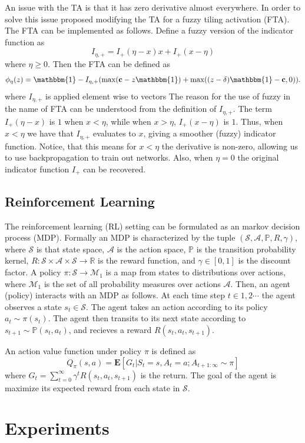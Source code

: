 \documentclass{article}
\newcommand{\RR}{\mathbb{R}}
\newcommand{\PP}{\mathbb{P}}
\newcommand{\cS}{\mathcal{S}}
\newcommand{\cA}{\mathcal{A}}
\newcommand{\cM}{\mathcal{M}}
\begin{document}
An issue with the TA is that it has zero derivative almost everywhere.
In order to solve this issue \cite{pan2019fuzzy} proposed modifying the TA for a fuzzy tiling activation (FTA).
The FTA can be implemented as follows.
Define a fuzzy version of the indicator function as 
$$I_{\eta, +} = I_+(\eta -x)x + I_+(x - \eta)$$
where $\eta \ge 0$.
Then the FTA can be defined as
$$\phi_\eta(z) = \mathbbm{1} - I_{\eta, +} (\max(\mathbf{c} - z \mathbbm{1}) + \max((z-\delta)\mathbbm{1} - \mathbf{c}, 0)).$$
where $I_{\eta, +}$ is applied element wise to vectors
The reason for the use of fuzzy in the name of FTA can be understood from the definition of $I_{\eta, +}$.
The term $I_+(\eta -x)$ is $1$ when $x < \eta$, while when $x > \eta$, $I_+(x - \eta)$ is $1$.
Thus, when $x < \eta$ we have that $I_{\eta ,+}$ evaluates to $x$, giving a smoother (fuzzy) indicator function.
Notice, that this means for $x < \eta$ the derivative is non-zero, allowing us to use backpropagation to train out networks.
Also, when $\eta = 0$ the original indicator function $I_+$ can be recovered.

\subsection{Reinforcement Learning} \label{sub-sec:reinforcement}
The reinforcement learning (RL) setting can be formulated as an markov decision process (MDP).
Formally an MDP is characterized by the tuple $(\cS, \cA, \PP, R, \gamma)$, where $\cS$ is that state space, $\cA$ is the action space,
$\PP$ is the transition probability kernel, $R: \cS \times \cA \times \cS \to \RR$ is the reward function, and $\gamma \in [0, 1]$ is the discount factor.
A policy $\pi: \cS \to \cM_1$ is a map from states to distributions over actions, where $\cM_1$ is the set of all probability measures over actions $\cA$.
Then, an agent (policy) interacts with an MDP as follows.
At each time step $t \in 1, 2 \cdots$ the agent observes a state $s_t \in \cS$.
The agent takes an action according to its policy $a_t \sim \pi(s_t)$.
The agent then transits to its next state according to $s_{t+1} \sim \PP(s_t, a_t)$, and recieves a reward $R(s_t, a_t, s_{t+1})$.

An action value function under policy $\pi$ is defined as 
$$Q_\pi(s, a) = \mathbf{E}[G_t|S_t =s, A_t=a; A_{t+1: \infty} \sim \pi]$$
where $G_t = \sum_{t=0}^\infty \gamma^t R(s_t, a_t, s_{t+1})$ is the return.
The goal of the agent is maximize its expected reward from each state in $\cS$.


\section{Experiments} \label{sec:experiments}
\end{document}
